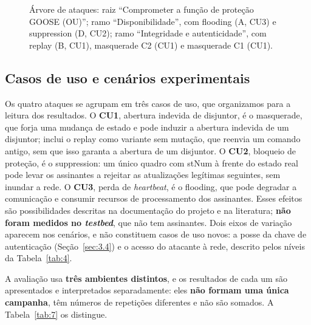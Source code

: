 \documentclass[12pt]{article}
\begin{document}
\begin{figure}[!t]
\centering

\caption{Árvore de ataques: raiz \textquotedblleft{}Comprometer a função de proteção GOOSE (OU)\textquotedblright{}; ramo \textquotedblleft{}Disponibilidade\textquotedblright{}, com flooding (A, CU3) e suppression (D, CU2); ramo \textquotedblleft{}Integridade e autenticidade\textquotedblright{}, com replay (B, CU1), masquerade C2 (CU1) e masquerade C1 (CU1).}\label{fig:1}
\end{figure}

\subsection{Casos de uso e cenários experimentais}\label{sec:3.6}

Os quatro ataques se agrupam em três casos de uso, que organizamos para a leitura dos resultados. O \textbf{CU1}, abertura indevida de disjuntor, é o masquerade, que forja uma mudança de estado e pode induzir a abertura indevida de um disjuntor; inclui o replay como variante sem mutação, que reenvia um comando antigo, sem que isso garanta a abertura de um disjuntor. O \textbf{CU2}, bloqueio de proteção, é o suppression: um único quadro com stNum à frente do estado real pode levar os assinantes a rejeitar as atualizações legítimas seguintes, sem inundar a rede. O \textbf{CU3}, perda de \emph{heartbeat}, é o flooding, que pode degradar a comunicação e consumir recursos de processamento dos assinantes. Esses efeitos são possibilidades descritas na documentação do projeto e na literatura; \textbf{não foram medidos no \emph{testbed}}, que não tem assinantes. Dois eixos de variação aparecem nos cenários, e não constituem casos de uso novos: a posse da chave de autenticação (Seção~\ref{sec:3.4}) e o acesso do atacante à rede, descrito pelos níveis da Tabela~\ref{tab:4}.

A avaliação usa \textbf{três ambientes distintos}, e os resultados de cada um são apresentados e interpretados separadamente: eles \textbf{não formam uma única campanha}, têm números de repetições diferentes e não são somados. A Tabela~\ref{tab:7} os distingue.
\end{document}
